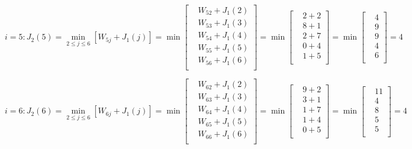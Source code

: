 \documentclass[UTF8]{ctexart}
\begin{document}
\begin{equation*}
    i=5:
    J_2(5)=\min_{2\leq j\leq6}[W_{5j}+J_1(j)]=\min
    \left[
    \begin{aligned}
        &W_{52}+J_1(2) \\
        &W_{53}+J_1(3) \\
        &W_{54}+J_1(4) \\
        &W_{55}+J_1(5) \\
        &W_{56}+J_1(6) \\
    \end{aligned}
    \right]
    =\min
    \left[
    \begin{aligned}
        &2+2 \\
        &8+1 \\
        &2+7 \\
        &0+4 \\
        &1+5 \\
    \end{aligned}
    \right]
    =\min
    \left[
    \begin{aligned}
        &4 \\
        &9 \\
        &9 \\
        &4 \\
        &6 \\
    \end{aligned}
    \right]
    =4
\end{equation*}

\begin{equation*}
    i=6:
    J_2(6)=\min_{2\leq j\leq6}[W_{6j}+J_1(j)]=\min
    \left[
    \begin{aligned}
        &W_{62}+J_1(2) \\
        &W_{63}+J_1(3) \\
        &W_{64}+J_1(4) \\
        &W_{65}+J_1(5) \\
        &W_{66}+J_1(6) \\
    \end{aligned}
    \right]
    =\min
    \left[
    \begin{aligned}
        &9+2 \\
        &3+1 \\
        &1+7 \\
        &1+4 \\
        &0+5 \\
    \end{aligned}
    \right]
    =\min
    \left[
    \begin{aligned}
        &11 \\
        &4 \\
        &8 \\
        &5 \\
        &5 \\
    \end{aligned}
    \right]
    =4
\end{equation*}
\end{document}
